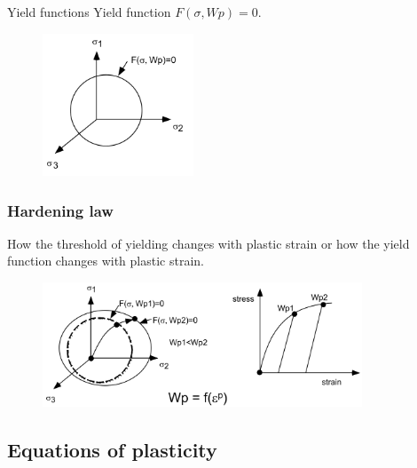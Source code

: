 \documentclass[handout]{beamer}
\begin{document}
\begin{frame}{Yield functions}
	Yield function $F(\sigma, Wp) = 0$.
	\begin{figure}
		\includegraphics[width=0.4\textwidth]{figs/yieldfn.png}
	\end{figure}
\end{frame}

\begin{frame}
\frametitle{Hardening law}
How the threshold of yielding changes with plastic strain or how the yield function changes with plastic strain.
\begin{figure}
	\includegraphics[width=0.85\textwidth]{figs/hardening-law.png}
\end{figure}
\end{frame}

\subsection{Equations of plasticity}
\end{document}
